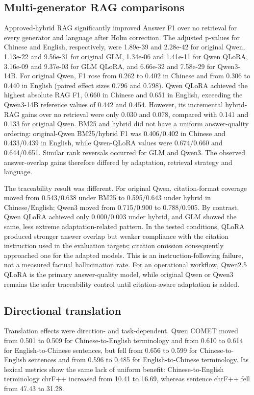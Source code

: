 \subsection{Multi-generator RAG comparisons}

Approved-hybrid RAG significantly improved Answer F1 over no retrieval for every generator and language after Holm correction. The adjusted p-values for Chinese and English, respectively, were 1.89e-39 and 2.28e-42 for original Qwen, 1.13e-22 and 9.56e-31 for original GLM, 1.34e-06 and 1.41e-11 for Qwen QLoRA, 3.16e-09 and 9.37e-03 for GLM QLoRA, and 6.66e-32 and 7.58e-29 for Qwen3-14B. For original Qwen, F1 rose from 0.262 to 0.402 in Chinese and from 0.306 to 0.440 in English (paired effect sizes 0.796 and 0.798). Qwen QLoRA achieved the highest absolute RAG F1, 0.660 in Chinese and 0.651 in English, exceeding the Qwen3-14B reference values of 0.442 and 0.454. However, its incremental hybrid-RAG gains over no retrieval were only 0.030 and 0.078, compared with 0.141 and 0.133 for original Qwen. BM25 and hybrid did not have a uniform answer-quality ordering: original-Qwen BM25/hybrid F1 was 0.406/0.402 in Chinese and 0.433/0.439 in English, while Qwen-QLoRA values were 0.674/0.660 and 0.644/0.651. Similar rank reversals occurred for GLM and Qwen3. The observed answer-overlap gains therefore differed by adaptation, retrieval strategy and language.

The traceability result was different. For original Qwen, citation-format coverage moved from 0.543/0.638 under BM25 to 0.595/0.643 under hybrid in Chinese/English; Qwen3 moved from 0.715/0.900 to 0.788/0.905. By contrast, Qwen QLoRA achieved only 0.000/0.003 under hybrid, and GLM showed the same, less extreme adaptation-related pattern. In the tested conditions, QLoRA produced stronger answer overlap but weaker compliance with the citation instruction used in the evaluation targets; citation omission consequently approached one for the adapted models. This is an instruction-following failure, not a measured factual hallucination rate. For an operational workflow, Qwen2.5 QLoRA is the primary answer-quality model, while original Qwen or Qwen3 remains the safer traceability control until citation-aware adaptation is added.

\subsection{Directional translation}

Translation effects were direction- and task-dependent. Qwen COMET moved from 0.501 to 0.509 for Chinese-to-English terminology and from 0.610 to 0.614 for English-to-Chinese sentences, but fell from 0.656 to 0.599 for Chinese-to-English sentences and from 0.596 to 0.485 for English-to-Chinese terminology. Its lexical metrics show the same lack of uniform benefit: Chinese-to-English terminology chrF++ increased from 10.41 to 16.69, whereas sentence chrF++ fell from 47.43 to 31.28.

